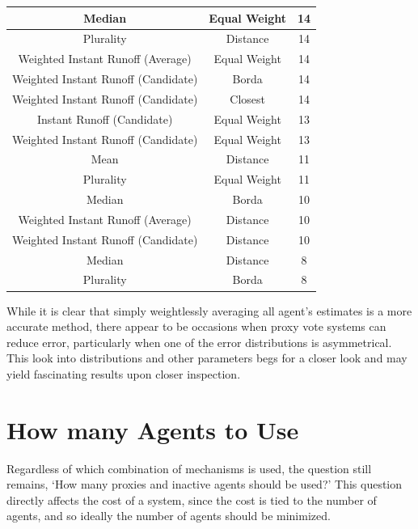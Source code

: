 \begin{table}[htbp]
\begin{tabular}{|c|c|c|}
        \hline
        Median                              & Equal Weight        & 14    \\
        \hline
        Plurality                           & Distance            & 14    \\
        \hline
        Weighted Instant Runoff (Average)   & Equal Weight        & 14    \\
        \hline
        Weighted Instant Runoff (Candidate) & Borda               & 14    \\
        \hline
        Weighted Instant Runoff (Candidate) & Closest             & 14    \\
        \hline
        Instant Runoff (Candidate)          & Equal Weight        & 13    \\
        \hline
        Weighted Instant Runoff (Candidate) & Equal Weight        & 13    \\
        \hline
        Mean                                & Distance            & 11    \\
        \hline
        Plurality                           & Equal Weight        & 11    \\
        \hline
        Median                              & Borda               & 10    \\
        \hline
        Weighted Instant Runoff (Average)   & Distance            & 10    \\
        \hline
        Weighted Instant Runoff (Candidate) & Distance            & 10    \\
        \hline
        Median                              & Distance            & 8     \\
        \hline
        Plurality                           & Borda               & 8     \\
        \hline
    \end{tabular}
\end{table}

While it is clear that simply weightlessly averaging all agent's estimates is a more
accurate method, there appear to be occasions when proxy vote systems can reduce
error, particularly when one of the error distributions is asymmetrical.
This look into distributions and other parameters begs for a closer look and may yield
fascinating results upon closer inspection.


\section{How many Agents to Use}\label{sec:how-many-agents}
Regardless of which combination of mechanisms is used, the question still remains,
`How many proxies and inactive agents should be used?'
This question directly affects the cost of a system, since the cost is tied to the
number of agents, and so ideally the number of agents should be minimized.

